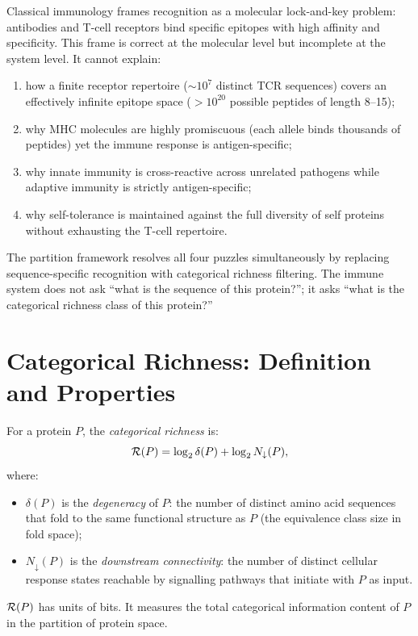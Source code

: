 Classical immunology frames recognition as a molecular lock-and-key problem:
antibodies and T-cell receptors bind specific epitopes with high affinity and
specificity. This frame is correct at the molecular level but incomplete at
the system level. It cannot explain:
\begin{enumerate}[label=(\roman*)]
  \item how a finite receptor repertoire ($\sim 10^7$ distinct TCR sequences)
        covers an effectively infinite epitope space ($> 10^{20}$ possible
        peptides of length 8--15);
  \item why MHC molecules are highly promiscuous (each allele binds thousands
        of peptides) yet the immune response is antigen-specific;
  \item why innate immunity is cross-reactive across unrelated pathogens
        while adaptive immunity is strictly antigen-specific;
  \item why self-tolerance is maintained against the full diversity of self
        proteins without exhausting the T-cell repertoire.
\end{enumerate}

The partition framework resolves all four puzzles simultaneously by replacing
sequence-specific recognition with categorical richness filtering. The immune
system does not ask ``what is the sequence of this protein?''; it asks ``what
is the categorical richness class of this protein?''

\section{Categorical Richness: Definition and Properties}
\label{sec:categorical_richness}

\begin{definition}
\label{def:categorical_richness}
For a protein $P$, the \emph{categorical richness} is:
\begin{equation}
  \mathcal{R}(P) = \log_2 \delta(P) + \log_2 N_{\downarrow}(P),
  \label{eq:richness}
\end{equation}
where:
\begin{itemize}
  \item $\delta(P)$ is the \emph{degeneracy} of $P$: the number of distinct
        amino acid sequences that fold to the same functional structure as $P$
        (the equivalence class size in fold space);
  \item $N_{\downarrow}(P)$ is the \emph{downstream connectivity}: the number
        of distinct cellular response states reachable by signalling pathways
        that initiate with $P$ as input.
\end{itemize}
$\mathcal{R}(P)$ has units of bits. It measures the total categorical information
content of $P$ in the partition of protein space.
\end{definition}


